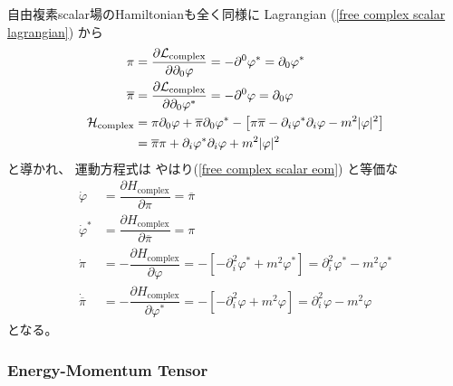 自由複素scalar場のHamiltonianも全く同様に
Lagrangian
(\ref{free complex scalar lagrangian})
から
\begin{subequations}
\begin{align}
    \pi
&=
    \dfrac{\partial \mathcal{L}_{\text{complex}}}
        {\partial \partial_0 \varphi}
=
    - \partial^0 \varphi^*
=
    \partial_0 \varphi^*
\notag\\
    \overline{\pi}
&=
    \dfrac{\partial \mathcal{L}_{\text{complex}}}
        {\partial \partial_0 \varphi^*}
=
    - \partial^0 \varphi
=
    \partial_0 \varphi
\notag\\
    \mathcal{H}_{\text{complex}}
&=
    \pi \partial_0 \varphi
    +
    \overline{\pi} \partial_0 \varphi^*
    -
    \left[
        \pi \overline{\pi}
    -
        \partial_i \varphi^*
        \partial_i \varphi
    -
        m^2 |\varphi|^2
    \right]
\notag\\&
=
        \overline{\pi} \pi
    +
        \partial_i \varphi^*
        \partial_i \varphi
    +
        m^2 |\varphi|^2
\end{align}
\end{subequations}
と導かれ、
運動方程式は
やはり(\ref{free complex scalar eom})
と等価な
\begin{subequations}
\begin{align}
    \dot{\varphi}
&=
    \dfrac{
        \partial H_{\text{complex}}
    }{ \partial \pi}
=
    \overline{\pi}
\\
    \dot{\varphi}^*
&=
    \dfrac{
        \partial H_{\text{complex}}
    }{ \partial \overline{\pi}}
=
    \pi
\\
    \dot{\pi}
&=
    -
    \dfrac{
        \partial H_{\text{complex}}
    }{ \partial \varphi}
=
    - \left[
    -
        \partial_i^2 \varphi^*
    +
        m^2 \varphi^*
    \right]
=
        \partial_i^2 \varphi^*
    -
        m^2 \varphi^*
\\
    \dot{\overline{\pi}}
&=
    -
    \dfrac{
        \partial H_{\text{complex}}
    }{ \partial \varphi^*}
=
    - \left[
    -
        \partial_i^2 \varphi
    +
        m^2 \varphi
    \right]
=
        \partial_i^2 \varphi
    -
        m^2 \varphi
\end{align}
\end{subequations}
となる。

\subsubsection{Energy-Momentum Tensor}

